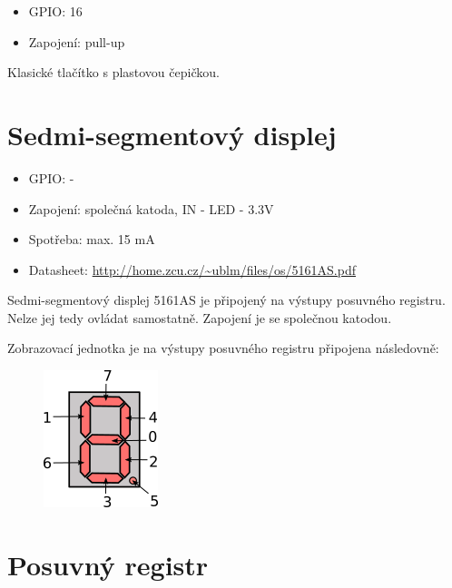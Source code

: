 \documentclass{article}
\newcommand\lang[2]{#1}
\begin{document}
\begin{itemize}
	\item GPIO: 16
	\item \lang{Zapojení: pull-up}{Wiring: pull-up}
\end{itemize}

\lang{Klasické tlačítko s plastovou čepičkou.}{Standard push button with plastic cap.}

\section{\lang{Sedmi-segmentový displej}{7-segment display}}

\begin{itemize}
	\item GPIO: -
	\item \lang{Zapojení: společná katoda}{Wiring: common cathode}, IN - LED - 3.3V
	\item \lang{Spotřeba}{Current}: max. 15 mA
	\item Datasheet: \url{http://home.zcu.cz/~ublm/files/os/5161AS.pdf}
\end{itemize}

\lang{Sedmi-segmentový displej 5161AS je připojený na výstupy posuvného registru. Nelze jej tedy ovládat samostatně. Zapojení je se společnou katodou.}{7-segment display 5161AS is connected directly to the outputs of the shift register. It's not possible to control it directly. It is wired with common cathode.}

\lang{Zobrazovací jednotka je na výstupy posuvného registru připojena následovně:}{The display is connected to the shift register as follows:}
\begin{figure}[ht!]
	\centering
	\includegraphics[width=0.3\linewidth]{kiv-dpp-01-segments.png}
\end{figure}

\section{\lang{Posuvný registr}{Shift register}}
\end{document}
